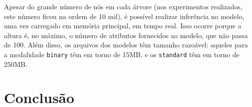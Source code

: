 \documentclass[12pt]{article}
\begin{document}
Apesar do grande número de nós em cada árvore (nos experimentos realizados, este número ficou na ordem de 10 mil), é possível realizar inferência no modelo, uma vez carregado em memória principal, em tempo real.
Isso ocorre porque a altura é, no máximo, o número de atributos fornecidos ao modelo, que não passa de 100. %
Além disso, os arquivos dos modelos têm tamanho razoável: aqueles para a modalidade \texttt{binary} têm em torno de 15MB, e os \texttt{standard} têm em torno de 250MB.


\section{Conclusão}
\label{sec:conclusion}




\end{document}
